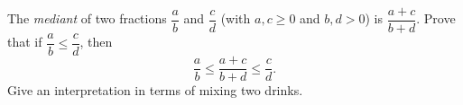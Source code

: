 The \emph{mediant} of two fractions $\dfrac ab$ and $\dfrac cd$ (with $a,c\ge0$ and $b,d>0$) is $\dfrac{a+c}{b+d}$. Prove that if $\dfrac ab\le\dfrac cd$, then
\[\dfrac ab\le\dfrac{a+c}{b+d}\le\dfrac cd.\]
Give an interpretation in terms of mixing two drinks.
